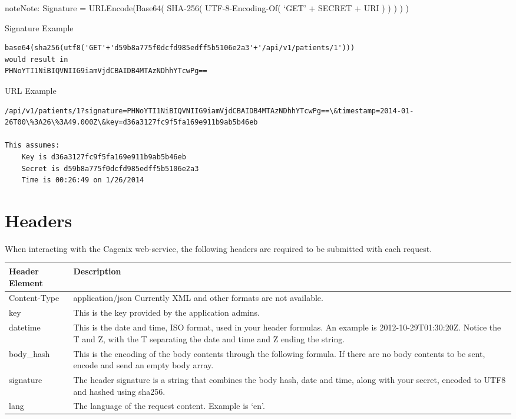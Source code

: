 \documentclass[letterpaper,10pt,english]{sphinxmanual}
\begin{document}
\begin{notice}{note}{Note:}
Signature = URLEncode(Base64( SHA-256( UTF-8-Encoding-Of( `GET' + SECRET + URI ) ) ) ) )
\end{notice}

Signature Example

\begin{Verbatim}[commandchars=\\\{\}]
base64(sha256(utf8('GET'+'d59b8a775f0dcfd985edff5b5106e2a3'+'/api/v1/patients/1')))
would result in
PHNoYTI1NiBIQVNIIG9iamVjdCBAIDB4MTAzNDhhYTcwPg==
\end{Verbatim}

URL Example

\begin{Verbatim}[commandchars=\\\{\}]
/api/v1/patients/1?signature=PHNoYTI1NiBIQVNIIG9iamVjdCBAIDB4MTAzNDhhYTcwPg==\&timestamp=2014-01-26T00\%3A26\%3A49.000Z\&key=d36a3127fc9f5fa169e911b9ab5b46eb

This assumes:
    Key is d36a3127fc9f5fa169e911b9ab5b46eb
    Secret is d59b8a775f0dcfd985edff5b5106e2a3
    Time is 00:26:49 on 1/26/2014
\end{Verbatim}


\section{Headers}
\label{dev-api-overview:headers}
When interacting with the Cagenix web-service, the following headers are
required to be submitted with each request.

\begin{tabulary}{\linewidth}{|L|L|}
\hline
\textsf{\relax 
Header Element
} & \textsf{\relax 
Description
}\\
\hline
Content-Type
 & 
application/json
Currently XML and other formats are not available.
\\

key
 & 
This is the key provided by the application admins.
\\

datetime
 & 
This is the date and time, ISO format, used in your
header formulas. An example is 2012-10-29T01:30:20Z.
Notice the T and Z, with the T separating the date and
time and Z ending the string.
\\

body\_hash
 & 
This is the encoding of the body contents through the
following formula. If there are no body contents to be
sent, encode and send an empty body array.
\\

signature
 & 
The header signature is a string that combines the body
hash, date and time, along with your secret, encoded to
UTF8 and hashed using sha256.
\\

lang
 & 
The language of the request content. Example is `en'.
\\
\hline\end{tabulary}
\end{document}
